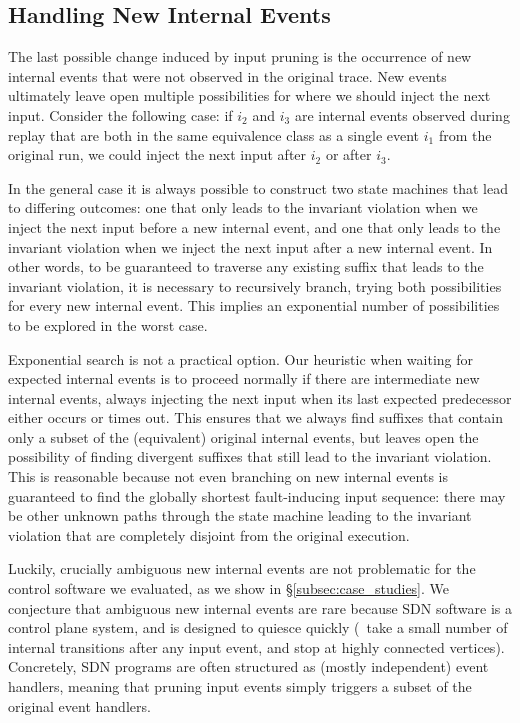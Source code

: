 \subsection{Handling New Internal Events}
\label{subsec:new_events}

The last possible change induced by input pruning is the occurrence of new
internal events that were not observed in the original trace.
New events ultimately leave open multiple possibilities for where
we should inject the next input. Consider the following case:
if $i_2$ and $i_3$ are internal events observed
during replay that are both in the same equivalence class as a single event $i_1$ from the
original run, we could inject the next input after $i_2$ or after $i_3$.


In the general case it is always possible to construct two state machines that lead
to differing outcomes: one that only leads to the invariant violation when
we inject the next input
before a new internal event, and one that only leads to the
invariant violation when we inject the next input after a new internal
event. In other words, to be guaranteed to traverse any existing suffix that leads
to the invariant violation, it is necessary to recursively branch, trying both
possibilities for every new internal event. This implies an exponential number of
possibilities to be explored in the worst case.

Exponential search is not a practical option. Our heuristic when waiting for expected internal
events is to proceed normally if there are intermediate new internal events,
always injecting the next input when its last expected predecessor
either occurs or times out. This ensures that we always find suffixes that
contain only a subset of the (equivalent) original internal events, but leaves open the
possibility of finding divergent suffixes that still lead to the invariant
violation. This is reasonable because not even branching on new
internal events is guaranteed to find the globally shortest fault-inducing input
sequence:
there may be other unknown
paths through the state machine leading to the invariant violation that are
completely disjoint from the original execution.

Luckily, crucially ambiguous new internal events are not problematic for the
control software we evaluated, as we show in \S\ref{subsec:case_studies}.
We conjecture that ambiguous new internal events are
rare because SDN software is a control plane system,
and is designed to quiesce quickly (\ie~take a small number of internal
transitions after any input event, and stop at highly connected vertices).
Concretely, SDN programs are often structured as (mostly independent) event
handlers, meaning that pruning input events simply triggers a subset of the original
event handlers.

